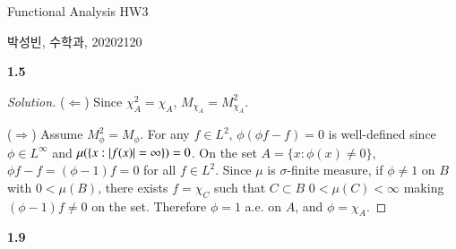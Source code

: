 \documentclass[a4paper, 12pt]{article}
\theoremstyle{Mydefinition}
\theoremstyle{Mytheorem}
\begin{document}
\thispagestyle{myfirstpage}
\begin{center}
	\Large{Functional Analysis HW3}
\end{center}
박성빈, 수학과, 20202120

\noindent \textbf{1.5}

\begin{proof}[Solution]
($\Leftarrow$) Since $\chi_A^2 = \chi_A$, $M_{\chi_A} = M_{\chi_A}^2$.

($\Rightarrow$) Assume $M_\phi^2 = M_\phi$. For any $f\in L^2$, $\phi(\phi f - f) = 0$ is well-defined since $\phi\in L^\infty$ and $\mu(\{x:\abs{f(x)} = \infty\}) = 0$. On the set $A = \{x:\phi(x)\neq 0\}$, $\phi f - f = (\phi - 1)f = 0$ for all $f\in L^2$. Since $\mu$ is $\sigma$-finite measure, if $\phi\neq 1$ on $B$ with $0<\mu(B)$, there exists $f = \chi_C$ such that $C\subset B$ $0<\mu(C)<\infty$ making $(\phi-1)f\neq 0$ on the set. Therefore $\phi = 1$ a.e. on $A$, and $\phi = \chi_A$.
\end{proof}

\noindent \textbf{1.9}
\end{document}
